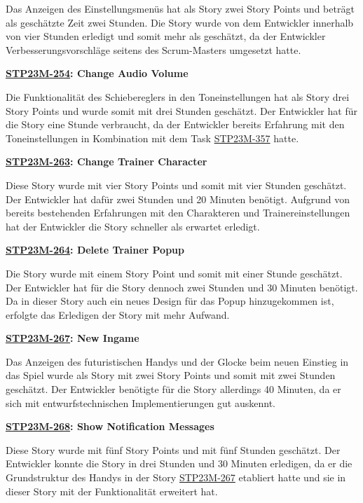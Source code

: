 Das Anzeigen des Einstellungsmenüs hat als Story zwei Story Points und beträgt als geschätzte Zeit zwei Stunden. Die Story wurde von dem Entwickler innerhalb von vier Stunden erledigt und somit mehr als geschätzt, da der Entwickler Verbesserungsvorschläge seitens des Scrum-Masters umgesetzt hatte.

\textbf{\hyperlink{T254}{\hypertarget{S254}{STP23M-254}}: Change Audio Volume}

Die Funktionalität des Schiebereglers in den Toneinstellungen hat als Story drei Story Points und wurde somit mit drei Stunden geschätzt. Der Entwickler hat für die Story eine Stunde verbraucht, da der Entwickler bereits Erfahrung mit den Toneinstellungen in Kombination mit dem Task \hyperlink{T357}{\hypertarget{S357}{STP23M-357}} hatte.

\textbf{\hyperlink{T263}{\hypertarget{S263}{STP23M-263}}: Change Trainer Character}

Diese Story wurde mit vier Story Points und somit mit vier Stunden geschätzt. Der Entwickler hat dafür zwei Stunden und 20 Minuten benötigt. Aufgrund von bereits bestehenden Erfahrungen mit den Charakteren und Trainereinstellungen hat der Entwickler die Story schneller als erwartet erledigt.

\textbf{\hyperlink{T264}{\hypertarget{S264}{STP23M-264}}: Delete Trainer Popup}

Die Story wurde mit einem Story Point und somit mit einer Stunde geschätzt. Der Entwickler hat für die Story dennoch zwei Stunden und 30 Minuten benötigt. Da in dieser Story auch ein neues Design für das Popup hinzugekommen ist, erfolgte das Erledigen der Story mit mehr Aufwand.

\textbf{\hyperlink{T267}{\hypertarget{S267}{STP23M-267}}: New Ingame}

Das Anzeigen des futuristischen Handys und der Glocke beim neuen Einstieg in das Spiel wurde als Story mit zwei Story Points und somit mit zwei Stunden geschätzt. Der Entwickler benötigte für die Story allerdings 40 Minuten, da er sich mit entwurfstechnischen Implementierungen gut auskennt.

\textbf{\hyperlink{T268}{\hypertarget{S268}{STP23M-268}}: Show Notification Messages}

Diese Story wurde mit fünf Story Points und mit fünf Stunden geschätzt. Der Entwickler konnte die Story in drei Stunden und 30 Minuten erledigen, da er die Grundstruktur des Handys in der Story \hyperlink{T267}{\hypertarget{S267}{STP23M-267}} etabliert hatte und sie in dieser Story mit der Funktionalität erweitert hat.

